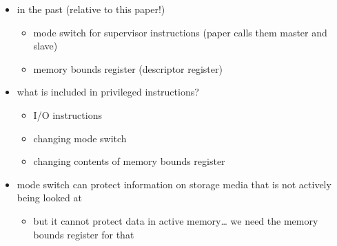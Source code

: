 \documentclass[
  12pt]{findlay}
\providecommand{\tightlist}{%
  \setlength{\itemsep}{0pt}\setlength{\parskip}{0pt}}
\begin{document}
\begin{itemize}
\tightlist
\item
  in the past (relative to this paper!)

  \begin{itemize}
  \tightlist
  \item
    mode switch for supervisor instructions (paper calls them master and
    slave)
  \item
    memory bounds register (descriptor register)
  \end{itemize}
\item
  what is included in privileged instructions?

  \begin{itemize}
  \tightlist
  \item
    I/O instructions
  \item
    changing mode switch
  \item
    changing contents of memory bounds register
  \end{itemize}
\item
  mode switch can protect information on storage media that is not
  actively being looked at

  \begin{itemize}
  \tightlist
  \item
    but it cannot protect data in active memory\ldots{} we need the
    memory bounds register for that
  \end{itemize}
\end{itemize}

\printbibliography
\end{document}
